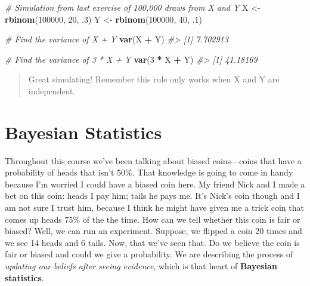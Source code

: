 \documentclass[]{article}
\newenvironment{Shaded}{\begin{snugshade}}{\end{snugshade}}
\newcommand{\CommentTok}[1]{\textcolor[rgb]{0.56,0.35,0.01}{\textit{#1}}}
\newcommand{\DecValTok}[1]{\textcolor[rgb]{0.00,0.00,0.81}{#1}}
\newcommand{\FloatTok}[1]{\textcolor[rgb]{0.00,0.00,0.81}{#1}}
\newcommand{\KeywordTok}[1]{\textcolor[rgb]{0.13,0.29,0.53}{\textbf{#1}}}
\newcommand{\NormalTok}[1]{#1}
\newcommand{\OperatorTok}[1]{\textcolor[rgb]{0.81,0.36,0.00}{\textbf{#1}}}
\newcommand{\StringTok}[1]{\textcolor[rgb]{0.31,0.60,0.02}{#1}}
\begin{document}
\begin{Shaded}
\begin{Highlighting}[]
\CommentTok{# Simulation from last exercise of 100,000 draws from X and Y}
\NormalTok{X <-}\StringTok{ }\KeywordTok{rbinom}\NormalTok{(}\DecValTok{100000}\NormalTok{, }\DecValTok{20}\NormalTok{, }\FloatTok{.3}\NormalTok{) }
\NormalTok{Y <-}\StringTok{ }\KeywordTok{rbinom}\NormalTok{(}\DecValTok{100000}\NormalTok{, }\DecValTok{40}\NormalTok{, }\FloatTok{.1}\NormalTok{)}

\CommentTok{# Find the variance of X + Y}
\KeywordTok{var}\NormalTok{(X }\OperatorTok{+}\StringTok{ }\NormalTok{Y)}
\CommentTok{#> [1] 7.702913}

\CommentTok{# Find the variance of 3 * X + Y}
\KeywordTok{var}\NormalTok{(}\DecValTok{3} \OperatorTok{*}\StringTok{ }\NormalTok{X }\OperatorTok{+}\StringTok{ }\NormalTok{Y)}
\CommentTok{#> [1] 41.18169}
\end{Highlighting}
\end{Shaded}

\begin{quote}
Great simulating! Remember this rule only works when X and Y are
independent.
\end{quote}

\hypertarget{bayesian-statistics}{%
\section{Bayesian Statistics}\label{bayesian-statistics}}

Throughout this course we've been talking about biased coins---coins
that have a probability of heads that isn't 50\%. That knowledge is
going to come in handy because I'm worried I could have a biased coin
here. My friend Nick and I made a bet on this coin: heads I pay him;
tails he pays me. It's Nick's coin though and I am not sure I trust him,
because I think he might have given me a trick coin that comes up heads
75\% of the the time. How can we tell whether this coin is fair or
biased? Well, we can run an experiment. Suppose, we flipped a coin 20
times and we see 14 heads and 6 tails. Now, that we've seen that. Do we
believe the coin is fair or biased and could we give a probability. We
are describing the process of \emph{updating our beliefs after seeing
evidence}, which is that heart of \textbf{Bayesian statistics}.
\end{document}
